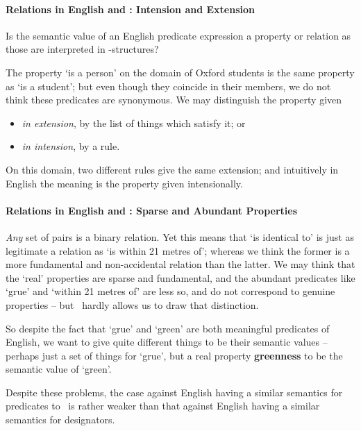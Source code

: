\paragraph{Relations in English and \ltwo: Intension and Extension}

Is the semantic value of an English predicate expression a property or relation as those are interpreted in \ltwo-structures?

The property `is a person' on the domain of Oxford students is the same property as `is a student'; but even though they coincide in their members, we do not think these predicates are synonymous. We may distinguish the property given \begin{itemize}\item \emph{in extension}, by the list of things which satisfy it; or \item \emph{in intension}, by a rule.\end{itemize} On this domain, two different rules give the same extension; and intuitively in English the meaning is the property given intensionally.

\paragraph{Relations in English and \ltwo: Sparse and Abundant Properties}


 \emph{Any} set of pairs is a binary relation. Yet this means that `is identical to' is just as legitimate a relation as `is within 21 metres of'; whereas we think the former is a more fundamental and non-accidental relation than the latter. We may think that the `real' properties are sparse and fundamental, and the abundant predicates like `grue' and `within 21 metres of' are less so, and do not correspond to genuine properties – but \ltwo\ hardly allows us to draw that distinction.

So despite the fact that `grue' and `green' are both meaningful predicates of English, we want to give quite different things to be their semantic values – perhaps just a set of things for `grue', but a real property \textbf{greenness} to be the semantic value of `green'.

Despite these problems, the case against English having a similar semantics for predicates to \ltwo\ is rather weaker than that against English having a similar semantics for designators.


